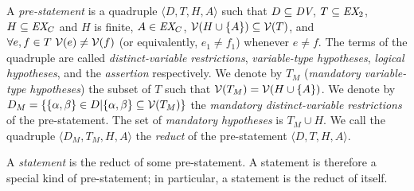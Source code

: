 A {\em pre-statement} is a
quadruple $\langle D,T,H,A \rangle$ such that
$D\subseteq \mbox{\em DV}$, $T\subseteq \mbox{\em EX}_2$, $H\subseteq
\mbox{\em EX}_C$ and $H$ is finite,
$A\in \mbox{\em EX}_C$, ${\cal V}(H\cup\{A\}) \subseteq
{\cal V}(T)$, and $\forall e,f\in T {\ } {\cal V}(e) \neq {\cal V}(f)$ (or
equivalently, $e_1 \ne f_1$) whenever $e \neq f$. The terms of the quadruple are called {\em
distinct-variable restrictions}, {\em variable-type hypotheses}, {\em logical hypotheses}, and the {\em assertion} respectively.  We denote by $T_M$ ({\em mandatory variable-type
hypotheses}) the
subset of $T$ such that ${\cal V}(T_M) ={\cal V}(H \cup \{A\})$.  We denote by
$D_M=\{\{\alpha,\beta\}\in D|\{\alpha,\beta\}\subseteq {\cal V}(T_M)\}$ the
{\em mandatory distinct-variable restrictions} of the pre-statement.
The set
of {\em mandatory hypotheses}
is $T_M\cup H$.  We call the quadruple $\langle D_M,T_M,H,A \rangle$
the {\em reduct} of
the pre-statement $\langle D,T,H,A \rangle$.

A {\em statement} is the reduct of some pre-statement.  A statement is therefore a special kind of pre-statement;
in particular, a statement is the reduct of itself.


